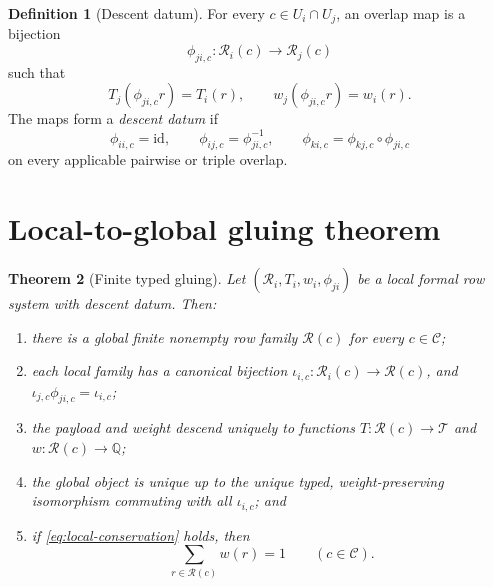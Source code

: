 \documentclass[11pt]{article}
\newtheorem{theorem}{Theorem}[section]
\theoremstyle{definition}
\newtheorem{definition}[theorem]{Definition}
\theoremstyle{remark}
\newcommand{\Rows}{\mathcal R}
\newcommand{\Cuts}{\mathcal C}
\newcommand{\Q}{\mathbb Q}
\begin{document}
\begin{definition}[Descent datum]\label{def:descent}
For every \(c\in U_i\cap U_j\), an overlap map is a bijection
\[
 \phi_{ji,c}:\Rows_i(c)\longrightarrow\Rows_j(c)
 \tag{2.2}\label{eq:overlap}
\]
such that
\[
 T_j(\phi_{ji,c}r)=T_i(r),\qquad
 w_j(\phi_{ji,c}r)=w_i(r).
 \tag{2.3}\label{eq:preserve}
\]
The maps form a \emph{descent datum} if
\[
\phi_{ii,c}=\mathrm{id},\qquad
\phi_{ij,c}=\phi_{ji,c}^{-1},\qquad
\phi_{ki,c}=\phi_{kj,c}\circ\phi_{ji,c}
\tag{2.4}\label{eq:cocycle}
\]
on every applicable pairwise or triple overlap.
\end{definition}

\section{Local-to-global gluing theorem}

\begin{theorem}[Finite typed gluing]\label{thm:gluing}
Let \((\Rows_i,T_i,w_i,\phi_{ji})\) be a local formal row system with
descent datum.  Then:
\begin{enumerate}[label=(\alph*),leftmargin=2.1em]
 \item there is a global finite nonempty row family \(\Rows(c)\) for
       every \(c\in\Cuts\);
 \item each local family has a canonical bijection
       \(\iota_{i,c}:\Rows_i(c)\to\Rows(c)\), and
       \(\iota_{j,c}\phi_{ji,c}=\iota_{i,c}\);
 \item the payload and weight descend uniquely to functions
       \(T:\Rows(c)\to\mathcal T\) and
       \(w:\Rows(c)\to\Q\);
 \item the global object is unique up to the unique typed,
       weight-preserving isomorphism commuting with all
       \(\iota_{i,c}\); and
 \item if \eqref{eq:local-conservation} holds, then
       \[
         \sum_{r\in\Rows(c)}w(r)=1
         \qquad(c\in\Cuts).
         \tag{3.1}\label{eq:global-conservation}
       \]
\end{enumerate}
\end{theorem}
\end{document}
